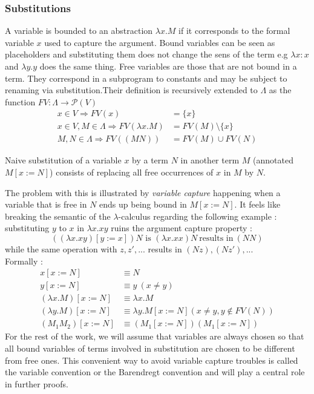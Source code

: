 \documentclass{article}
\newcounter{example}[section]
\begin{document}
    \subsubsection{Substitutions}\label{Bound and free variables}
    A variable is bounded to an abstraction $\lambda x.M$ if it corresponds to the formal variable $x$ used to capture the argument. Bound variables can be seen as placeholders and substituting them does not change the sens of the term e.g $\lambda x:x$ and $\lambda y.y$ does the same thing. Free variables are those that are not bound in a term. They correspond in a subprogram to constants and may be subject to renaming via substitution.Their definition is recursively extended to $\Lambda$ as the function $FV : \Lambda\rightarrow \mathscr{P}(V)$
    \label{fv}\begin{align*}
        x\in V \Rightarrow FV(x) &= \{x\}\\
        x\in V, M\in\Lambda \Rightarrow FV(\lambda x.M) &= FV(M) \setminus \{x\} \\
        M,N\in\Lambda \Rightarrow FV((M N)) &= FV(M)\cup FV(N)
    \end{align*}

     Naive substitution of a variable $x$ by a term $N$ in another term $M$ (annotated $M[x:=N]$) consists of replacing all free occurrences of $x$ in $M$ by $N$.\par The problem with this is illustrated by \textit{variable capture} happening when a variable that is free in $N$ ends up being bound in $M[x:=N]$. It feels like breaking the semantic of the $\lambda$-calculus regarding the following example : substituting $y$ to $x$  in $\lambda x.x y$ ruins the argument capture property :
    $$((\lambda x.x y)[y := x])N \text{ is } (\lambda x.x x)N \ \text{results in} \ (N N)$$ while the same operation with $z, z', ...$ results in $(N z), (N z'), ...$\\
    Formally :
    \label{simple substitution}\begin{align*}
            x[x:=N] &\equiv N\\
            y[x:=N] &\equiv y \ ( x\neq y)\\
            (\lambda x.M)[x:=N] &\equiv \lambda x.M \\
            (\lambda y.M)[x:=N] &\equiv \lambda y.M[x:=N]  (x\neq y,y\not\in FV(N)) \\
            (M_1 M_2)[x:=N] &\equiv (M_1[x:=N])(M_1[x:=N])
        \end{align*}
        For the rest of the work, we will assume that variables are always chosen so that all bound variables of terms involved in substitution are chosen to be different from free ones. This convenient way to avoid variable capture troubles is called the variable convention or the Barendregt \cite{10.5555/162552.162561} convention and will play a central role in further proofs.
\end{document}
